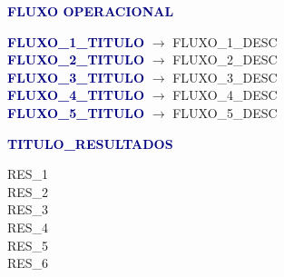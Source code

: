 \documentclass[a4paper,landscape]{article}
\begin{document}
\hfill
\begin{minipage}[t]{0.31\textwidth}

{\fontsize{10}{12}\selectfont\textsf{\textcolor{navy}{}\;\textcolor{navy}{\textbf{FLUXO OPERACIONAL}}}}

\begin{tcolorbox}[box, colback=navy!4, colframe=navy!4]
\fontsize{8}{11}\selectfont\textsf{%
\textcolor{gold}{} \textcolor{navy}{\textbf{{{FLUXO_1_TITULO}}}} $\rightarrow$ {{FLUXO_1_DESC}}\\[1.5mm]
\textcolor{gold}{} \textcolor{navy}{\textbf{{{FLUXO_2_TITULO}}}} $\rightarrow$ {{FLUXO_2_DESC}}\\[1.5mm]
\textcolor{gold}{} \textcolor{navy}{\textbf{{{FLUXO_3_TITULO}}}} $\rightarrow$ {{FLUXO_3_DESC}}\\[1.5mm]
\textcolor{gold}{} \textcolor{navy}{\textbf{{{FLUXO_4_TITULO}}}} $\rightarrow$ {{FLUXO_4_DESC}}\\[1.5mm]
\textcolor{gold}{} \textcolor{navy}{\textbf{{{FLUXO_5_TITULO}}}} $\rightarrow$ {{FLUXO_5_DESC}}%
}
\end{tcolorbox}

\vspace{3mm}

{\fontsize{10}{12}\selectfont\textsf{\textcolor{gold}{}\;\textcolor{navy}{\textbf{{{TITULO_RESULTADOS}}}}}}

\begin{tcolorbox}[box, colback=gold!6, colframe=gold!25, boxrule=0.4pt]
\fontsize{8}{11}\selectfont\textsf{%
\textcolor{success}{} {{RES_1}}\\[1mm]
\textcolor{success}{} {{RES_2}}\\[1mm]
\textcolor{success}{} {{RES_3}}\\[1mm]
\textcolor{success}{} {{RES_4}}\\[1mm]
\textcolor{success}{} {{RES_5}}\\[1mm]
\textcolor{success}{} {{RES_6}}%
}
\end{tcolorbox}


\end{minipage}
\end{document}
